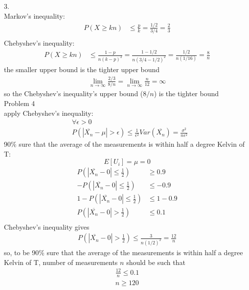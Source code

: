 \documentclass[12pt,border=4pt,multi]{article} %
\begin{document}
\\
\\
\\
\\
3.\\
Markov's inequality:
\begin{align*}
P(X \geq kn) &\leq \frac{p}{k} = \frac{1 / 2}{3 / 4} = \frac{2}{3}\\
\end{align*}
Chebyshev's inequality: 
\begin{align*}
P(X \geq kn) &\leq \frac{1 - p}{n(k - p)^2} = \frac{1 - 1 / 2}{n(3 / 4 - 1 / 2)^2} = \frac{1 / 2}{n(1 / 16)} = \frac{8}{n}
\end{align*}
the smaller upper bound is the tighter upper bound
\begin{align*}
\lim_{n \rightarrow \infty} \frac{2 / 3}{8 / n} = \lim_{n \rightarrow \infty} \frac{n}{12} = \infty
\end{align*}
so the Chebyshev's inequality's upper bound ($8 / n$) is the tighter bound\\
\newpage
\noindent
Problem 4\\
apply Chebyshev's inequality:
\begin{align*}
&\forall \epsilon > 0\\
&P(|\overline{X_n} - \mu| > \epsilon) \leq \frac{1}{\epsilon^2} Var(\overline{X_n}) = \frac{\sigma^2}{n\epsilon^2}
\end{align*}
90\% sure that the average of the measurements is within half a degree Kelvin of T:
\[E[U_i] = \mu = 0\]
\begin{align*}
P\left(|\overline{X_n} - 0| \leq \frac{1}{2}\right) &\geq 0.9\\
- P\left(|\overline{X_n} - 0| \leq \frac{1}{2}\right) &\leq - 0.9\\
1 - P\left(|\overline{X_n} - 0| \leq \frac{1}{2}\right) &\leq 1 - 0.9\\
P\left(|\overline{X_n} - 0| > \frac{1}{2}\right) &\leq 0.1\\
\end{align*}
Chebyshev's inequality gives
\begin{align*}
P\left(|\overline{X_n} - 0| > \frac{1}{2}\right) \leq \frac{3}{n(1 / 2)^2} = \frac{12}{n}
\end{align*}
so, to be 90\% sure that the average of the measurements is within half a degree Kelvin of T, number of measurements $n$ should be such that
\begin{align*}
\frac{12}{n} \leq 0.1\\
\boxed{n \geq 120}\\
\end{align*}
\end{document}
